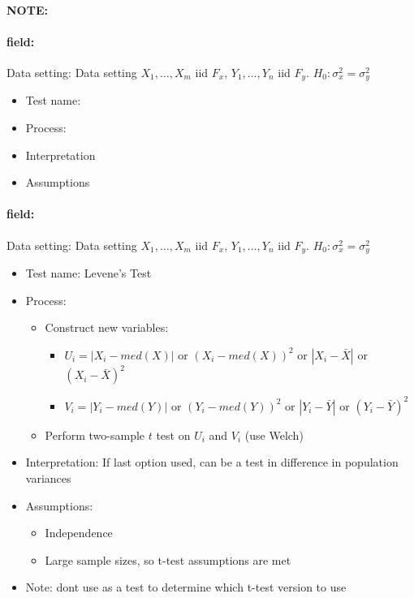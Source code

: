 \documentclass[12pt]{article}
\newenvironment{note}{\paragraph{NOTE:}}{}
\newenvironment{field}{\paragraph{field:}}{}
\begin{document}
\begin{note}
 \begin{field}
  Data setting: Data setting $X_1, \ldots , X_m$ iid $F_x$, $Y_1, \ldots, Y_n$ iid $F_y$. $H_0: \sigma_x^2 = \sigma_y^2$
  \begin{itemize}
   \item Test name:
   \item Process:
   \item Interpretation
   \item Assumptions
  \end{itemize}
 \end{field}
 \begin{field}
  Data setting: Data setting $X_1, \ldots , X_m$ iid $F_x$, $Y_1, \ldots, Y_n$ iid $F_y$. $H_0: \sigma_x^2 = \sigma_y^2$
  \begin{itemize}
   \item Test name: Levene's Test
   \item Process:
         \begin{itemize}
          \item Construct new variables:
                \begin{itemize}
                 \item $U_i = |X_i - med(X)|$ or $(X_i - med(X))^2$ or $|X_i - \bar{X}|$ or $(X_i - \bar{X})^2$
                 \item $V_i = |Y_i - med(Y)|$ or $(Y_i - med(Y))^2$ or $|Y_i - \bar{Y}|$ or $(Y_i - \bar{Y})^2$
                \end{itemize}
          \item Perform two-sample $t$ test on $U_i$ and $V_i$ (use Welch)
         \end{itemize}
   \item Interpretation: If last option used, can be a test in difference in population variances
   \item Assumptions:
         \begin{itemize}
          \item Independence
          \item Large sample sizes, so t-test assumptions are met
         \end{itemize}
   \item Note: dont use as a test to determine which t-test version to use
  \end{itemize}
 \end{field}
\end{note}
\end{document}

